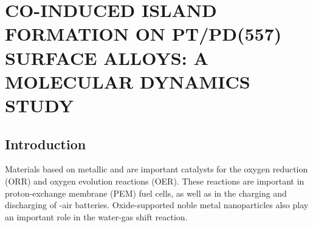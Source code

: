 
\chapter{CO-INDUCED ISLAND FORMATION ON PT/PD(557) SURFACE ALLOYS: A MOLECULAR DYNAMICS STUDY}





\section{Introduction}

Materials based on metallic  and  are important
catalysts for the oxygen reduction
(ORR)\citep{Lim:2009fk,Liu:2012bs,Limpattayanate:2014ij} and oxygen
evolution reactions (OER).\citep{Stamenkovic:2007kk,Reier:2012uq} These
reactions are important in proton-exchange membrane (PEM) fuel
cells,\citep{Bliznakov:2012kx,Shao:2013rm} as well as in the charging
and discharging of -air batteries.\citep{Lu:2011vn}
Oxide-supported noble metal nanoparticles also play an important role in
the water-gas shift reaction.\citep{Bunluesin:1998ys,Kugai:2011rt}

